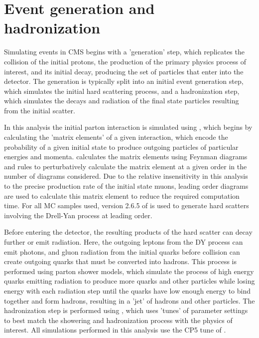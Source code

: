 \section{Event generation and hadronization}
Simulating events in CMS begins with a 'generation' step, which replicates the collision of the initial protons, the production of the primary physics process of interest, and its initial decay, producing the set of particles that enter into the detector. 
The generation is typically split into an initial event generation step, which simulates the initial hard scattering process, and a hadronization step, which simulates the decays and radiation of the final state particles resulting from the initial scatter.

In this analysis the initial parton interaction is simulated using \mg \cite{Maltoni_2003}, which begins by calculating the 'matrix elements' of a given interaction, which encode the probability of a given initial state to produce outgoing particles of particular energies and momenta.
\mg calculates the matrix elements using Feynman diagrams and rules to perturbatively calculate the matrix element at a given order in the number of diagrams considered.
Due to the relative insensitivity in this analysis to the precise production rate of the initial state muons, leading order diagrams are used to calculate this matrix element to reduce the required computation time.
For all MC samples used, version 2.6.5 of \mg is used to generate hard scatters involving the Drell-Yan process at leading order. 

Before entering the detector, the resulting products of the hard scatter can decay further or emit radiation.
Here, the outgoing leptons from the DY process can emit photons, and gluon radiation from the initial quarks before collision can create outgoing quarks that must be converted into hadrons. 
This process is performed using parton shower models, which simulate the process of high energy quarks emitting radiation to produce more quarks and other particles while losing energy with each radiation step until the quarks have low enough energy to bind together and form hadrons, resulting in a 'jet' of hadrons and other particles.
The hadronization step is performed using \pythia, which uses 'tunes' of parameter settings to best match the showering and hadronization process with the physics of interest. 
All simulations performed in this analysis use the CP5 tune of \pythia \cite{pythia_tune}. 

